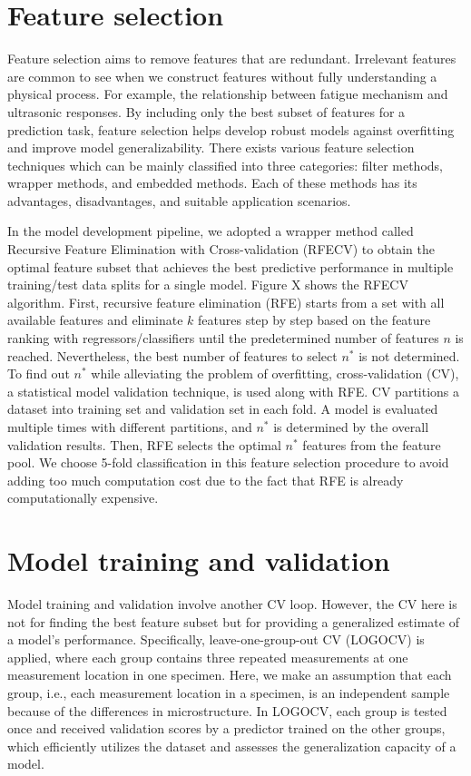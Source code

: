 \section{Feature selection}
Feature selection aims to remove features that are redundant. Irrelevant features are common to see when we construct features without fully understanding a physical process. For example, the relationship between fatigue mechanism and ultrasonic responses. By including only the best subset of features for a prediction task, feature selection helps develop robust models against overfitting and improve model generalizability. There exists various feature selection techniques which can be mainly classified into three categories: filter methods, wrapper methods, and embedded methods. Each of these methods has its advantages, disadvantages, and suitable application scenarios.

In the model development pipeline, we adopted a wrapper method called Recursive Feature Elimination with Cross-validation (RFECV) to obtain the optimal feature subset that achieves the best predictive performance in multiple training/test data splits for a single model. Figure X shows the RFECV algorithm. First, recursive feature elimination (RFE) starts from a set with all available features and eliminate $k$ features step by step based on the feature ranking with regressors/classifiers until the predetermined number of features $n$ is reached. Nevertheless, the best number of features to select $n^*$ is not determined. To find out $n^*$ while alleviating the problem of overfitting, cross-validation (CV), a statistical model validation technique, is used along with RFE. CV partitions a dataset into training set and validation set in each fold. A model is evaluated multiple times with different partitions, and $n^*$ is determined by the overall validation results. Then, RFE selects the optimal $n^*$ features from the feature pool. We choose 5-fold classification in this feature selection procedure to avoid adding too much computation cost due to the fact that RFE is already computationally expensive.

\section{Model training and validation}
\label{sec: model train and val}
Model training and validation involve another CV loop. However, the CV here is not for finding the best feature subset but for providing a generalized estimate of a model's performance. Specifically, leave-one-group-out CV (LOGOCV) is applied, where each group contains three repeated measurements at one measurement location in one specimen. Here, we make an assumption that each group, i.e., each measurement location in a specimen, is an independent sample because of the differences in microstructure. In LOGOCV, each group is tested once and received validation scores by a predictor trained on the other groups, which efficiently utilizes the dataset and assesses the generalization capacity of a model.

